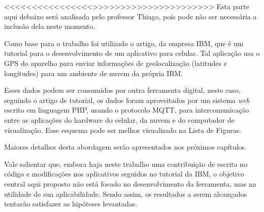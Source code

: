 <<<<<<<<<<<<<<<<>>>>>>>>>>>>>>>>>>>>>>
Esta parte aqui debaixo será analisada pelo professor Thiago, pois pode não ser necessária a inclusão dela neste momento.

Como base para o trabalho foi utilizado o artigo, da empresa IBM\cite{IBM}, que é um tutorial para o desenvolvimento de um aplicativo para celular. Tal aplicação usa o GPS do aparelho para enviar informações de geolocalização (latitudes e longitudes) para um ambiente de nuvem da própria IBM.

Esses dados podem ser consumidos por outra ferramenta digital, neste caso, seguindo o artigo de tutorial, os dados foram aproveitados por um sistema \textit{web} escrito em linguagem PHP, usando o protocolo MQTT, para intercomunicação entre as aplicações do hardware do celular, da nuvem e do computador de visualização. Esse esquema pode ser melhor visualizado na Lista de Figuras.

Maiores detalhes desta abordagem serão apresentados nos próximos capítulos.

Vale salientar que, embora haja neste trabalho uma contribuição de escrita no código e modificações nos aplicativos seguidos no tutorial da IBM, o objetivo central aqui proposto não está focado no desenvolvimento da ferramenta, mas na utilidade de sua aplicabilidade. Sendo assim, os resultados a serem alcançados tentarão satisfazer as hipóteses levantadas. 
